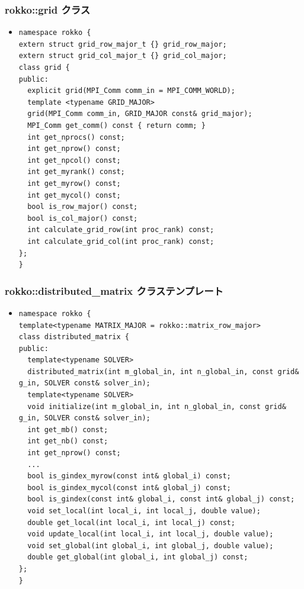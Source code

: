 \begin{frame}[c,fragile]
  \frametitle{rokko::grid クラス}
  \begin{itemize}
  \item {}
\begin{lstlisting}
namespace rokko {
extern struct grid_row_major_t {} grid_row_major;
extern struct grid_col_major_t {} grid_col_major;
class grid {
public:
  explicit grid(MPI_Comm comm_in = MPI_COMM_WORLD);
  template <typename GRID_MAJOR>
  grid(MPI_Comm comm_in, GRID_MAJOR const& grid_major);
  MPI_Comm get_comm() const { return comm; }
  int get_nprocs() const;
  int get_nprow() const;
  int get_npcol() const;
  int get_myrank() const;
  int get_myrow() const;
  int get_mycol() const;
  bool is_row_major() const;
  bool is_col_major() const;
  int calculate_grid_row(int proc_rank) const;
  int calculate_grid_col(int proc_rank) const;
};
}
\end{lstlisting}
  \end{itemize}
\end{frame}


\begin{frame}[c,fragile]
  \frametitle{rokko::distributed\_matrix クラステンプレート}
  \begin{itemize}
  \item {}
\begin{lstlisting}
namespace rokko {
template<typename MATRIX_MAJOR = rokko::matrix_row_major>
class distributed_matrix {
public:
  template<typename SOLVER>
  distributed_matrix(int m_global_in, int n_global_in, const grid& g_in, SOLVER const& solver_in);
  template<typename SOLVER>
  void initialize(int m_global_in, int n_global_in, const grid& g_in, SOLVER const& solver_in);
  int get_mb() const;
  int get_nb() const;
  int get_nprow() const;
  ...
  bool is_gindex_myrow(const int& global_i) const;
  bool is_gindex_mycol(const int& global_j) const;
  bool is_gindex(const int& global_i, const int& global_j) const;
  void set_local(int local_i, int local_j, double value);
  double get_local(int local_i, int local_j) const;
  void update_local(int local_i, int local_j, double value);
  void set_global(int global_i, int global_j, double value);
  double get_global(int global_i, int global_j) const;
};
}
\end{lstlisting}
  \end{itemize}
\end{frame}

